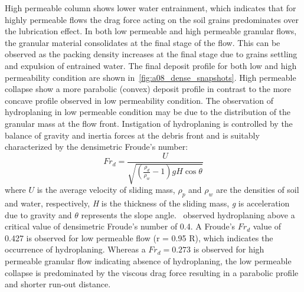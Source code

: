 High permeable column shows lower water entrainment, which indicates that for 
highly permeable flows the drag force acting on the soil grains predominates 
over the lubrication effect. In both low permeable and high permeable granular 
flows, the granular material consolidates at the final stage of the flow. This 
can be observed as the packing density increases at the final stage due to 
grains settling and expulsion of entrained water. The final deposit profile for 
both low and high permeability condition are shown 
in~\cref{fig:a08_dense_snapshots}. High permeable collapse show a more 
parabolic (convex) deposit profile in contrast to the more concave profile 
observed in low permeability condition. The observation of hydroplaning in low 
permeable condition may be due to the distribution of the granular mass at the 
flow front. Instigation of hydroplaning is controlled by the balance of gravity 
and inertia forces at the debris front and is suitably characterized by the 
densimetric Froude's number:
%
\begin{equation}
Fr_d = \frac{U}{\sqrt{(\frac{\rho_d}{\rho_w}-1)gH\cos\theta}}
\end{equation}
where $U$ is the average velocity of sliding mass, $\rho_p$ and $\rho_w$ are 
the densities of soil and water, respectively, \textit{H} is the thickness of 
the sliding mass, \textit{g} is acceleration due to gravity and $\theta$ 
represents the slope angle.~\citet{Harbitz2003} observed 
hydroplaning above a critical value of densimetric Froude's number of 0.4. A 
Froude's $Fr_d$ value of 0.427 is observed for low permeable flow (r = 0.95 R), 
which indicates the occurrence of hydroplaning. Whereas a $Fr_d = 0.273$ is 
observed 
for high permeable granular flow indicating absence of hydroplaning, the low 
permeable collapse is predominated by the viscous drag force resulting in a 
parabolic profile and shorter run-out distance. 
